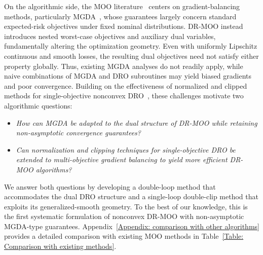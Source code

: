 \documentclass[twoside]{article} %
\theoremstyle{plain}
\theoremstyle{definition}
\theoremstyle{remark}
\begin{document}

On the algorithmic side, the MOO literature~\citep{gradient-balance-MTL} centers on gradient-balancing methods, particularly MGDA~\citep{1stempiricalMGDAwork,MGDA1stwork,stochasticMGDA}, whose guarantees largely concern standard expected-risk objectives under fixed nominal distributions. DR-MOO instead introduces nested worst-case objectives and auxiliary dual variables, fundamentally altering the optimization geometry. Even with uniformly Lipschitz continuous and smooth losses, the resulting dual objectives need not satisfy either property globally. Thus, existing MGDA analyses do not readily apply, while naive combinations of MGDA and DRO subroutines may yield biased gradients and poor convergence. Building on the effectiveness of normalized and clipped methods for single-objective nonconvex DRO~\citep{jinnonconvexdro,qirevistfDRO}, these challenges motivate two algorithmic questions:
\begin{itemize}[leftmargin=*, topsep=0pt]
\item \textit{How can MGDA be adapted to the dual structure of DR-MOO while retaining non-asymptotic convergence guarantees?}
\item \textit{Can normalization and clipping techniques for single-objective DRO be extended to multi-objective gradient balancing to yield more efficient DR-MOO algorithms?}
\end{itemize}
We answer both questions by developing a double-loop method that accommodates the dual DRO structure and a single-loop double-clip method that exploits its generalized-smooth geometry. To the best of our knowledge, this is the first systematic formulation of nonconvex DR-MOO with non-asymptotic MGDA-type guarantees. Appendix~\ref{Appendix: comparison with other algorithms} provides a detailed comparison with existing MOO methods in Table~\ref{Table: Comparison with existing methods}.
\end{document}
